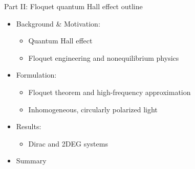 \documentclass[xcolor=dvipsnames,10pt,aspectratio=169]{beamer}
\begin{document}
  \begin{frame}{Part II: Floquet quantum Hall effect outline}
    \begin{itemize}
      \item Background \& Motivation:
      \begin{itemize}
        \item Quantum Hall effect
        \item Floquet engineering and nonequilibrium physics
      \end{itemize}
      \item Formulation:
      \begin{itemize}
        \item Floquet theorem and high-frequency approximation
        \item Inhomogeneous, circularly polarized light
      \end{itemize}
      \item Results:
      \begin{itemize}
        \item Dirac and 2DEG systems
      \end{itemize}
      \item Summary
    \end{itemize}
  \end{frame}
\end{document}

